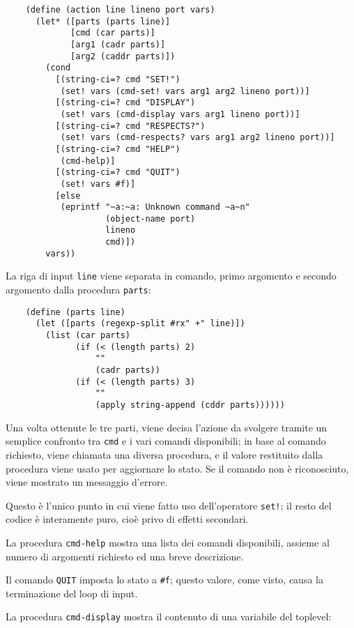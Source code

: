 \begin{lstlisting}
    (define (action line lineno port vars)
      (let* ([parts (parts line)]
             [cmd (car parts)]
             [arg1 (cadr parts)]
             [arg2 (caddr parts)])
        (cond
          [(string-ci=? cmd "SET!")
           (set! vars (cmd-set! vars arg1 arg2 lineno port))]
          [(string-ci=? cmd "DISPLAY")
           (set! vars (cmd-display vars arg1 lineno port))]
          [(string-ci=? cmd "RESPECTS?")
           (set! vars (cmd-respects? vars arg1 arg2 lineno port))]
          [(string-ci=? cmd "HELP")
           (cmd-help)]
          [(string-ci=? cmd "QUIT")
           (set! vars #f)]
          [else
           (eprintf "~a:~a: Unknown command ~a~n"
                    (object-name port)
                    lineno
                    cmd)])
        vars))
\end{lstlisting}

La riga di input \lstinline{line} viene separata in comando, primo
argomento e secondo argomento dalla procedura \lstinline{parts}:

\begin{lstlisting}
    (define (parts line)
      (let ([parts (regexp-split #rx" +" line)])
        (list (car parts)
              (if (< (length parts) 2)
                  ""
                  (cadr parts))
              (if (< (length parts) 3)
                  ""
                  (apply string-append (cddr parts))))))
\end{lstlisting}

Una volta ottenute le tre parti, viene decisa l'azione da svolgere
tramite un semplice confronto tra \lstinline{cmd} e i vari comandi
disponibili; in base al comando richiesto, viene chiamata una diversa
procedura, e il valore restituito dalla procedura viene usato per
aggiornare lo stato. Se il comando non \`e riconosciuto, viene mostrato
un messaggio d'errore.

Questo \`e l'unico punto in cui viene fatto uso dell'operatore
\lstinline{set!}; il resto del codice \`e interamente puro, cio\`e privo
di effetti secondari.

La procedura \lstinline{cmd-help} mostra una lista dei comandi
disponibili, assieme al numero di argomenti richiesto ed una breve
descrizione.

Il comando \lstinline{QUIT} imposta lo stato a \lstinline{#f}; questo
valore, come visto, causa la terminazione del loop di input.

La procedura \lstinline{cmd-display} mostra il contenuto di una
variabile del toplevel:

